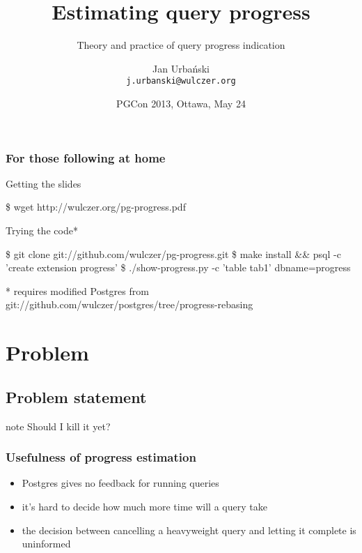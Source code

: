 \documentclass{beamer}
\title{Estimating query progress}
\subtitle{Theory and practice of query progress indication}
\author[Jan Urbański]{Jan Urbański \\ \texttt{j.urbanski@wulczer.org}}
\institute{Ducksboard}
\date[PGCon 2013]{PGCon 2013, Ottawa, May 24}
\begin{document}
\frame{\titlepage}

\begin{frame}[fragile]
  \frametitle{For those following at home}

  \begin{block}{Getting the slides}
    \begin{semiverbatim}
    \$ wget http://wulczer.org/pg-progress.pdf
    \end{semiverbatim}
  \end{block}

  \begin{block}{Trying the code\alert{*}}
    \begin{semiverbatim}
    \$ git clone git://github.com/wulczer/pg-progress.git
    \$ make install && psql -c 'create extension progress'
    \$ ./show-progress.py -c 'table tab1' dbname=progress
    \end{semiverbatim}
  \end{block}

  {\tiny\alert{*} requires modified Postgres from git://github.com/wulczer/postgres/tree/progress-rebasing}
\end{frame}

\begin{frame}
  \tableofcontents
\end{frame}

\section{Problem}
\subsection{Problem statement}

\begin{frame}
\begin{beamercolorbox}[center]{note}
  \Huge Should I kill it yet?
\end{beamercolorbox}
\end{frame}

\begin{frame}
  \frametitle{Usefulness of progress estimation}

  \begin{itemize}
  \item Postgres gives no feedback for running queries
  \item it's hard to decide how much more time will a query take
  \item the decision between cancelling a heavyweight query and letting it
    complete is uninformed
  \end{itemize}
\end{frame}
\end{document}
